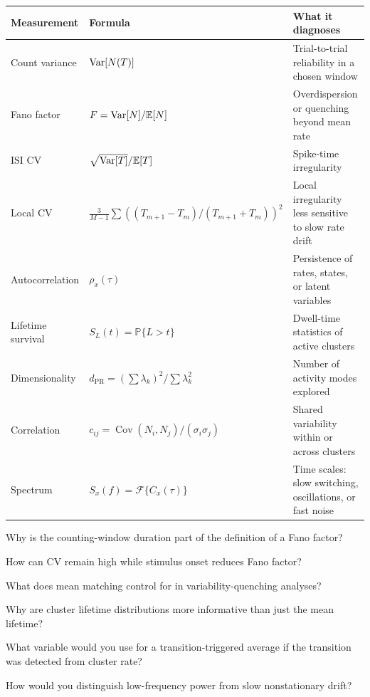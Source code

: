 \begin{chaptersummary}

\begin{center}
\renewcommand{\arraystretch}{1.5}
\begin{tabularx}{\textwidth}{@{}l X X@{}}
  \toprule
  \textbf{Measurement} & \textbf{Formula} & \textbf{What it diagnoses} \\
  \midrule
  Count variance &
  $\operatorname{Var}[N(T)]$ &
  Trial-to-trial reliability in a chosen window \\
  Fano factor &
  $F=\operatorname{Var}[N]/\mathbb{E}[N]$ &
  Overdispersion or quenching beyond mean rate \\
  ISI CV &
  $\sqrt{\operatorname{Var}[T]}/\mathbb{E}[T]$ &
  Spike-time irregularity \\
  Local CV &
  $\frac{3}{M-1}\sum((T_{m+1}-T_m)/(T_{m+1}+T_m))^2$ &
  Local irregularity less sensitive to slow rate drift \\
  Autocorrelation &
  $\rho_x(\tau)$ &
  Persistence of rates, states, or latent variables \\
  Lifetime survival &
  $S_L(t)=\mathbb{P}\{L>t\}$ &
  Dwell-time statistics of active clusters \\
  Dimensionality &
  $d_{\mathrm{PR}}=(\sum\lambda_k)^2/\sum\lambda_k^2$ &
  Number of activity modes explored \\
  Correlation &
  $c_{ij}=\operatorname{Cov}(N_i,N_j)/(\sigma_i\sigma_j)$ &
  Shared variability within or across clusters \\
  Spectrum &
  $S_x(f)=\mathcal{F}\{C_x(\tau)\}$ &
  Time scales: slow switching, oscillations, or fast noise \\
  \bottomrule
\end{tabularx}
\end{center}

\end{chaptersummary}

\begin{conceptquestions}
  \item Why is the counting-window duration part of the definition of a Fano factor?
  \item How can CV remain high while stimulus onset reduces Fano factor?
  \item What does mean matching control for in variability-quenching analyses?
  \item Why are cluster lifetime distributions more informative than just the mean lifetime?
  \item What variable would you use for a transition-triggered average if the transition was detected from cluster rate?
  \item How would you distinguish low-frequency power from slow nonstationary drift?
\end{conceptquestions}

\clearpage
